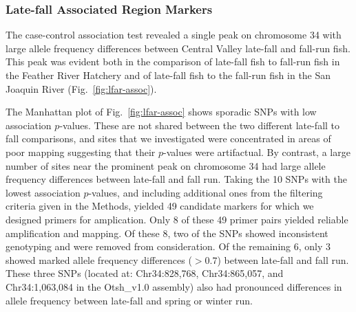 \subsubsection*{Late-fall Associated Region Markers}

The case-control association test revealed a single peak on chromosome 34 with large allele frequency differences
between Central Valley late-fall and fall-run fish.  This peak was evident both in the comparison of
late-fall fish to fall-run fish in the Feather River Hatchery and of late-fall fish to the fall-run fish in
the San Joaquin River (Fig.~\ref{fig:lfar-assoc}).




The Manhattan plot of Fig.~\ref{fig:lfar-assoc} shows sporadic SNPs with low association
$p$-values.  These are not shared between the two different late-fall to fall comparisons, and
sites that we investigated were concentrated in areas of poor mapping suggesting that their
$p$-values were artifactual.  By contrast, a large number of sites near the prominent peak on
chromosome 34 had large allele frequency differences between late-fall and fall run.  Taking the
10 SNPs with the lowest association $p$-values, and including additional ones from the filtering criteria given in the
Methods, yielded 49 candidate markers for which we designed primers for amplication.  Only 8
of these 49 primer pairs yielded reliable amplification and mapping.   Of these 8, two of the SNPs 
showed inconsistent genotyping and were removed from consideration.  Of the remaining 6, only 3 
showed marked allele frequency differences ($> 0.7$) between late-fall and fall run.  These three 
SNPs (located at: Chr34:828,768,  Chr34:865,057, and Chr34:1,063,084 in the Otsh\_v1.0 assembly)
also had pronounced differences in allele frequency between 
late-fall and spring or winter run.

